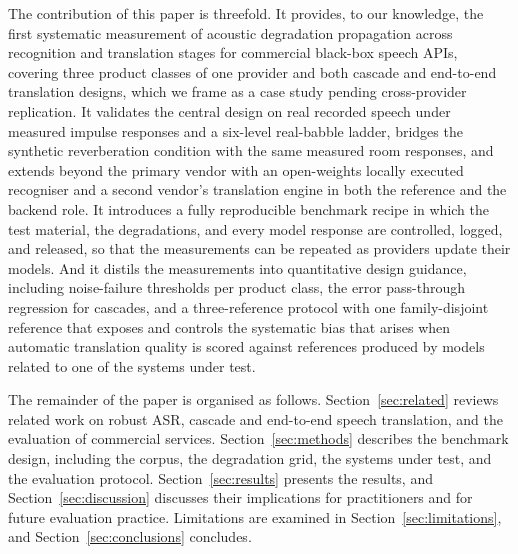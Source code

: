 The contribution of this paper is threefold. It provides, to our knowledge,
the first systematic measurement of acoustic degradation propagation across
recognition and translation stages for commercial black-box speech APIs,
covering three product classes of one provider and both cascade and
end-to-end translation designs, which we frame as a case study pending
cross-provider replication. It validates the central design on real recorded
speech under measured impulse responses and a six-level real-babble ladder,
bridges the synthetic reverberation condition with the same measured room
responses, and extends beyond the primary vendor with an open-weights
locally executed recogniser and a second vendor's translation engine in
both the reference and the backend role. It introduces a fully reproducible benchmark
recipe in which the test material, the degradations, and every model response
are controlled, logged, and released, so that the measurements can be
repeated as providers update their models. And it distils the measurements
into quantitative design guidance, including noise-failure thresholds per
product class, the error pass-through regression for cascades, and a
three-reference protocol with one family-disjoint reference that exposes
and controls the systematic bias that
arises when automatic translation quality is scored against references
produced by models related to one of the systems under test.

The remainder of the paper is organised as follows.
Section~\ref{sec:related} reviews related work on robust ASR, cascade and
end-to-end speech translation, and the evaluation of commercial services.
Section~\ref{sec:methods} describes the benchmark design, including the
corpus, the degradation grid, the systems under test, and the evaluation
protocol. Section~\ref{sec:results} presents the results, and
Section~\ref{sec:discussion} discusses their implications for practitioners
and for future evaluation practice. Limitations are examined in
Section~\ref{sec:limitations}, and Section~\ref{sec:conclusions} concludes.
